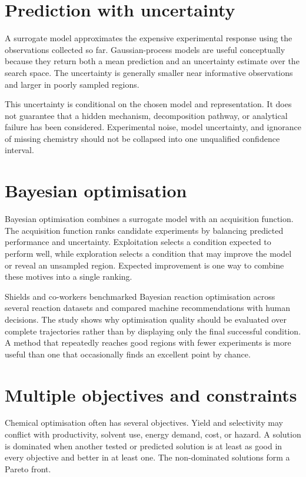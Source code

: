 \section{Prediction with uncertainty}

A surrogate model approximates the expensive experimental response using the observations collected so far.
Gaussian-process models are useful conceptually because they return both a mean prediction and an uncertainty estimate over the search space.
The uncertainty is generally smaller near informative observations and larger in poorly sampled regions.

This uncertainty is conditional on the chosen model and representation.
It does not guarantee that a hidden mechanism, decomposition pathway, or analytical failure has been considered.
Experimental noise, model uncertainty, and ignorance of missing chemistry should not be collapsed into one unqualified confidence interval.

\section{Bayesian optimisation}

Bayesian optimisation combines a surrogate model with an acquisition function.
The acquisition function ranks candidate experiments by balancing predicted performance and uncertainty.
Exploitation selects a condition expected to perform well, while exploration selects a condition that may improve the model or reveal an unsampled region.
Expected improvement is one way to combine these motives into a single ranking.

Shields and co-workers benchmarked Bayesian reaction optimisation across several reaction datasets and compared machine recommendations with human decisions.
The study shows why optimisation quality should be evaluated over complete trajectories rather than by displaying only the final successful condition.
A method that repeatedly reaches good regions with fewer experiments is more useful than one that occasionally finds an excellent point by chance.

\section{Multiple objectives and constraints}

Chemical optimisation often has several objectives.
Yield and selectivity may conflict with productivity, solvent use, energy demand, cost, or hazard.
A solution is dominated when another tested or predicted solution is at least as good in every objective and better in at least one.
The non-dominated solutions form a Pareto front.

